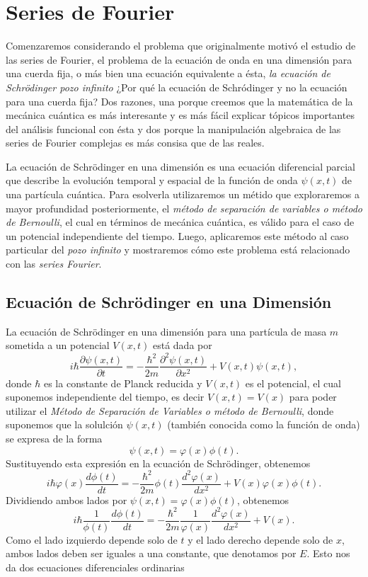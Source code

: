 \documentclass[main.tex]{subfiles}
\begin{document}
\chapter{Series de Fourier}
\noindent Comenzaremos considerando el problema que originalmente motivó el estudio de las series de Fourier, el problema de la ecuación de onda en una dimensión para una cuerda fija, o más bien una ecuación equivalente a ésta, \emph{la ecuación de Schrödinger pozo infinito} ¿Por qué la ecuación de Schródinger y no la ecuación para una cuerda fija? Dos razones, una porque creemos que la matemática de la mecánica cuántica es más interesante y es más fácil explicar tópicos importantes del análisis funcional con ésta y dos porque la manipulación algebraica de las series de Fourier complejas es más consisa que de las reales.

La ecuación de Schrödinger en una dimensión es una ecuación diferencial parcial que describe la evolución temporal y espacial de la función de onda \(\psi(x, t)\) de una partícula cuántica. Para esolverla utilizaremos  un métido que exploraremos a mayor profundidad posteriormente, el \emph{método de separación de variables o método de Bernoulli}, el cual en términos de mecánica cuántica, es válido para el caso de un potencial independiente del tiempo. Luego, aplicaremos este método al caso particular del \emph{pozo infinito} y mostraremos cómo este problema está relacionado con las \emph{series Fourier}.

\section{Ecuación de Schrödinger en una Dimensión}

La ecuación de Schrödinger en una dimensión para una partícula de masa \(m\) sometida a un potencial \(V(x,t)\) está dada por
\[
i\hbar \frac{\partial \psi(x, t)}{\partial t} = -\frac{\hbar^2}{2m} \frac{\partial^2 \psi(x, t)}{\partial x^2} + V(x,t) \psi(x, t),
\]
donde \(\hbar\) es la constante de Planck reducida y \(V(x,t)\) es el potencial, el cual suponemos independiente del tiempo, es decir \(V(x,t)=V(x)\) para poder utilizar el \emph{Método de Separación de Variables o método de Bernoulli}, donde suponemos que la solulción \(\psi(x, t)\) (también conocida como la función de onda) se expresa de la forma
\[
\psi(x, t) = \varphi(x) \phi(t).
\]
Sustituyendo esta expresión en la ecuación de Schrödinger, obtenemos
\[
i\hbar \varphi(x) \frac{d \phi(t)}{dt} = -\frac{\hbar^2}{2m} \phi(t) \frac{d^2 \varphi(x)}{dx^2} + V(x) \varphi(x) \phi(t).
\]
Dividiendo ambos lados por \(\psi(x, t) = \varphi(x) \phi(t)\), obtenemos
\[
i\hbar \frac{1}{\phi(t)} \frac{d \phi(t)}{dt} = -\frac{\hbar^2}{2m} \frac{1}{\varphi(x)} \frac{d^2 \varphi(x)}{dx^2} + V(x).
\]
Como el lado izquierdo depende solo de \(t\) y el lado derecho depende solo de \(x\), ambos lados deben ser iguales a una constante, que denotamos por \(E\). Esto nos da dos ecuaciones diferenciales ordinarias
\end{document}
